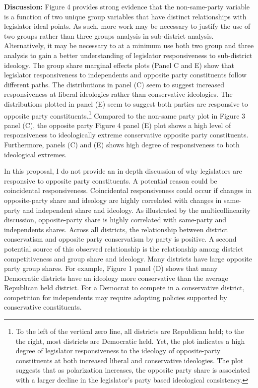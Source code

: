\documentclass[10pt,letterpaper]{article}
\begin{document}
\textbf{Discussion:} Figure 4 provides strong evidence that the non-same-party variable is a function of two unique group variables that have distinct relationships with legislator ideal points. As such, more work may be necessary to justify the use of two groups rather than three groups analysis in sub-district analysis. Alternatively, it may be necessary to at a minimum use both two group and three analysis to gain a better understanding of legislator responsiveness to sub-district ideology. The group share marginal effects plots (Panel C and E) show that legislator responsiveness to independents and opposite party constituents follow different paths. The distributions in panel (C) seem to suggest increased responsiveness at liberal ideologies rather than conservative ideologies. The distributions plotted in panel (E) seem to suggest both parties are responsive to opposite party constituents.\footnote{To the left of the vertical zero line, all districts are Republican held; to the the right, most districts are Democratic held. Yet, the plot indicates a high degree of legislator responsiveness to the ideology of opposite-party constituents at both increased liberal and conservative ideologies. The plot suggests that as polarization increases, the opposite party share is associated with a larger decline in the legislator's party based ideological consistency.} Compared to the non-same party plot in Figure 3 panel (C), the opposite party Figure 4 panel (E) plot shows a high level of responsiveness to ideologically extreme conservative opposite party constituents. Furthermore, panels (C) and (E) shows high degree of responsiveness to both ideological extremes.

In this proposal, I do not provide an in depth discussion of why legislators are responsive to opposite party constituents. A potential reason could be coincidental responsiveness. Coincidental responsiveness could occur if changes in opposite-party share and ideology are highly correlated with changes in same-party and independent share  and ideology.  As illustrated by the multicollinearity discussion, opposite-party share is highly correlated with same-party and independents shares. Across all districts, the relationship between district conservatism and opposite party conservatism by party is positive. A second potential source of this observed relationship is the relationship among district competitiveness and group share and ideology. Many districts have large opposite party group shares. For example, Figure 1 panel (D) shows that many Democratic districts have an ideology more conservative than the average Republican held district. For a Democrat to compete in a conservative district, competition for independents may require adopting policies supported by conservative constituents.
\end{document}
